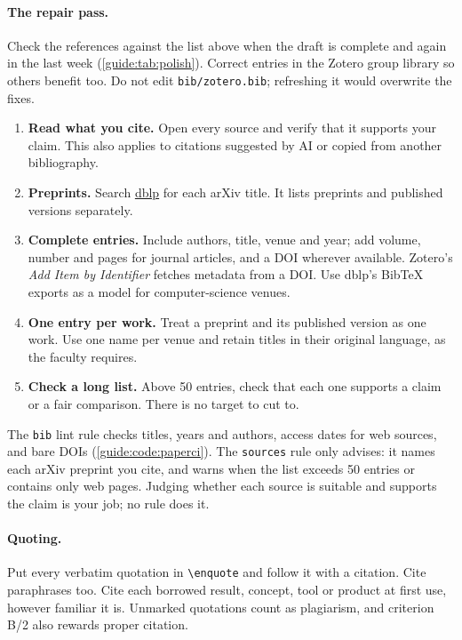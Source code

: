 \paragraph{The repair pass.} Check the references against the list above when the draft is complete and again in the last week (\cref{guide:tab:polish}). Correct entries in the Zotero group library so others benefit too. Do not edit \texttt{bib/zotero.bib}; refreshing it would overwrite the fixes.
\begin{enumerate}
  \item \textbf{Read what you cite.} Open every source and verify that it supports your claim. This also applies to citations suggested by AI or copied from another bibliography.
  \item \textbf{Preprints.} Search \href{https://dblp.org/}{dblp} for each arXiv title. It lists preprints and published versions separately.
  \item \textbf{Complete entries.} Include authors, title, venue and year; add volume, number and pages for journal articles, and a DOI wherever available. Zotero's \emph{Add Item by Identifier} fetches metadata from a DOI. Use dblp's BibTeX exports as a model for computer-science venues.
  \item \textbf{One entry per work.} Treat a preprint and its published version as one work. Use one name per venue and retain titles in their original language, as the faculty requires.
  \item \textbf{Check a long list.} Above 50 entries, check that each one supports a claim or a fair comparison. There is no target to cut to.
\end{enumerate}
The \texttt{bib} lint rule checks titles, years and authors, access dates for web sources, and bare DOIs (\cref{guide:code:paperci}). The \texttt{sources} rule only advises: it names each arXiv preprint you cite, and warns when the list exceeds 50 entries or contains only web pages. Judging whether each source is suitable and supports the claim is your job; no rule does it.

\paragraph{Quoting.} Put every verbatim quotation in \texttt{\textbackslash enquote} and follow it with a citation. Cite paraphrases too. Cite each borrowed result, concept, tool or product at first use, however familiar it is. Unmarked quotations count as plagiarism, and criterion B/2 also rewards proper citation.

